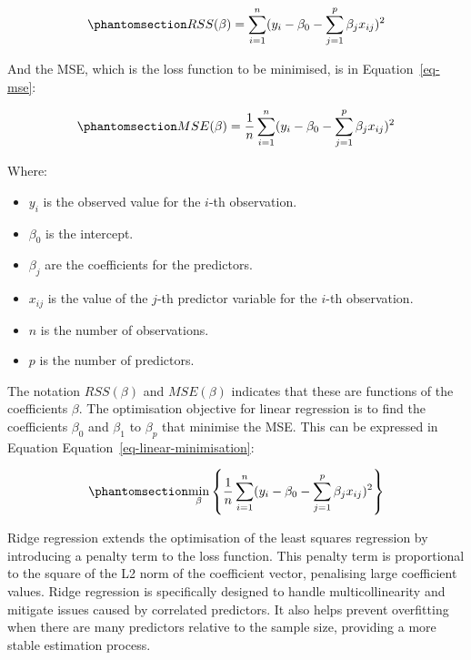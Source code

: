 \documentclass[
  letterpaper,
]{book}
\providecommand{\tightlist}{%
  \setlength{\itemsep}{0pt}\setlength{\parskip}{0pt}}\usepackage{longtable,booktabs,array}
\begin{document}
\begin{equation}\phantomsection\label{eq-rss}{RSS(\beta) = \sum_{i=1}^{n} (y_i - \beta_0 - \sum_{j=1}^{p} \beta_j x_{ij})^2}\end{equation}

And the MSE, which is the loss function to be minimised, is in
Equation~\ref{eq-mse}:

\begin{equation}\phantomsection\label{eq-mse}{MSE(\beta) = \frac{1}{n} \sum_{i=1}^{n} (y_i - \beta_0 - \sum_{j=1}^{p} \beta_j x_{ij})^2}\end{equation}

Where:

\begin{itemize}
\tightlist
\item
  \(y_i\) is the observed value for the \(i\)-th observation.
\item
  \(\beta_0\) is the intercept.
\item
  \(\beta_j\) are the coefficients for the predictors.
\item
  \(x_{ij}\) is the value of the \(j\)-th predictor variable for the
  \(i\)-th observation.
\item
  \(n\) is the number of observations.
\item
  \(p\) is the number of predictors.
\end{itemize}

The notation \(RSS(\beta)\) and \(MSE(\beta)\) indicates that these are
functions of the coefficients \(\beta\). The optimisation objective for
linear regression is to find the coefficients \(\beta_0\) and
\(\beta_1\) to \(\beta_p\) that minimise the MSE. This can be expressed
in Equation Equation~\ref{eq-linear-minimisation}:

\begin{equation}\phantomsection\label{eq-linear-minimisation}{\min_{\beta} \left\{ \frac{1}{n} \sum_{i=1}^n (y_i - \beta_0 - \sum_{j=1}^p \beta_j x_{ij})^2 \right\}}\end{equation}

Ridge regression extends the optimisation of the least squares
regression by introducing a penalty term to the loss function. This
penalty term is proportional to the square of the L2 norm of the
coefficient vector, penalising large coefficient values. Ridge
regression is specifically designed to handle multicollinearity and
mitigate issues caused by correlated predictors. It also helps prevent
overfitting when there are many predictors relative to the sample size,
providing a more stable estimation process.
\end{document}
